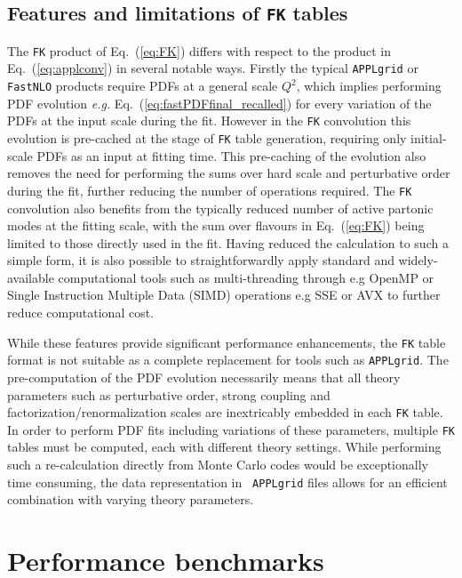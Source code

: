 \documentclass[preprint,12pt]{elsarticle}
\begin{document}
\subsection{Features and limitations of {\tt FK} tables}

The {\tt FK} product of Eq.~(\ref{eq:FK}) differs with respect to the
product in Eq.~(\ref{eq:applconv}) in several notable ways. Firstly
the typical {\tt APPLgrid} or {\tt FastNLO} products require PDFs at a
general scale $Q^2$, which implies performing PDF evolution {\it e.g.}
Eq.~(\ref{eq:fastPDFfinal_recalled}) for every variation of the PDFs
at the input scale during the fit. However in the {\tt FK} convolution
this evolution is pre-cached at the stage of {\tt FK} table
generation, requiring only initial-scale PDFs as an input at fitting
time. This pre-caching of the evolution also removes the need for
performing the sums over hard scale and perturbative order during the
fit, further reducing the number of operations required.  The {\tt FK}
convolution also benefits from the typically reduced number of active
partonic modes at the fitting scale, with the sum over flavours in
Eq.~(\ref{eq:FK}) being limited to those directly used in the
fit. Having reduced the calculation to such a simple form, it is also
possible to straightforwardly apply standard and widely-available
computational tools such as multi-threading through e.g OpenMP or
Single Instruction Multiple Data (SIMD) operations e.g SSE or AVX to
further reduce computational cost.

While these features provide significant performance enhancements, the
{\tt FK} table format is not suitable as a complete replacement for
tools such as {\tt APPLgrid}. The pre-computation of the PDF evolution
necessarily means that all theory parameters such as perturbative
order, strong coupling and factorization/renormalization scales are
inextricably embedded in each {\tt FK} table. In order to perform PDF
fits including variations of these parameters, multiple {\tt FK}
tables must be computed, each with different theory settings. While
performing such a re-calculation directly from Monte Carlo codes would
be exceptionally time consuming, the data representation in {\tt
  APPLgrid} files allows for an efficient combination with varying
theory parameters.

\section{Performance benchmarks}
\label{sec:benchmark}
\end{document}
